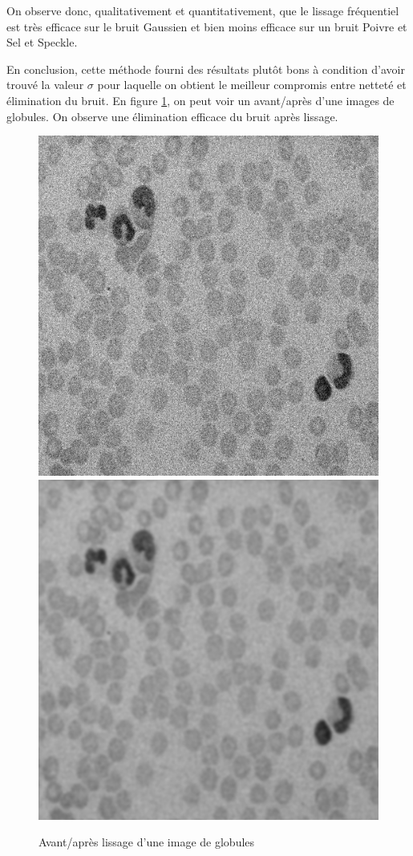\documentclass[paper=a4, fontsize=11pt]{scrartcl} %
\begin{document}
On observe donc, qualitativement et quantitativement, que le lissage fréquentiel est très efficace sur le bruit Gaussien et bien moins efficace sur un bruit Poivre et Sel et Speckle. 

En conclusion, cette méthode fourni des résultats plutôt bons à condition d'avoir trouvé la valeur $\sigma$ pour laquelle on obtient le meilleur compromis entre netteté et élimination du bruit. En figure \ref{avantapresglobules}, on peut voir un avant/après d'une images de globules. On observe une élimination efficace du bruit après lissage.

\begin{figure}[h!]
\centering
\caption{Avant/après lissage d'une image de globules}
\label{avantapresglobules}
\includegraphics[scale=0.3]{images/rapport/globulesav.png} 
\includegraphics[scale=0.3]{images/rapport/globules2.png}

\end{figure}
\end{document}
